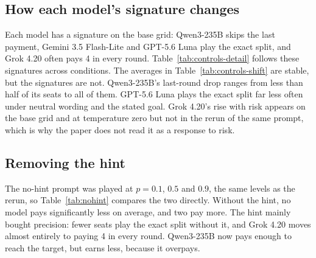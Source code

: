 \documentclass[10pt]{article}
\let\plainsubsection\subsection
\renewcommand{\subsection}{\FloatBarrier\needspace{8\baselineskip}\plainsubsection}
\begin{document}
\begin{table}[h]
\caption{Base grid, neutral wording and goal stated at $p=0$, $0.1$ and $0.9$ (ten games per entry): mean seat total, games reaching the target, and seats paying anything (of 60). $P$: permutation test on the mean total, neutral wording against goal stated.}
\label{tab:controls-goal}
\centering\small

\end{table}

\subsection{How each model's signature changes}

Each model has a signature on the base grid: Qwen3-235B skips the last payment, Gemini 3.5 Flash-Lite and GPT-5.6 Luna play the exact split, and Grok 4.20 often pays 4 in every round. Table~\ref{tab:controls-detail} follows these signatures across conditions. The averages in Table~\ref{tab:controls-shift} are stable, but the signatures are not. Qwen3-235B's last-round drop ranges from less than half of its seats to all of them. GPT-5.6 Luna plays the exact split far less often under neutral wording and the stated goal. Grok 4.20's rise with risk appears on the base grid and at temperature zero but not in the rerun of the same prompt, which is why the paper does not read it as a response to risk.

\begin{table}[h]
\caption{Model signatures by condition, at $p=0.1$ and $0.9$ pooled (20 games per model). \emph{Exact split}: seats paying 2 in all ten rounds. \emph{Total at 0.9 minus at 0.1}: Grok 4.20's mean seat total, with a permutation $P$. \emph{Distinct games}: game records per ten-game cell that differ in at least one move, averaged over cells.}
\label{tab:controls-detail}
\centering\small

\end{table}

\subsection{Removing the hint}

The no-hint prompt was played at $p=0.1$, $0.5$ and $0.9$, the same levels as the rerun, so Table~\ref{tab:nohint} compares the two directly. Without the hint, no model pays significantly less on average, and two pay more. The hint mainly bought precision: fewer seats play the exact split without it, and Grok 4.20 moves almost entirely to paying 4 in every round. Qwen3-235B now pays enough to reach the target, but earns less, because it overpays.
\end{document}
